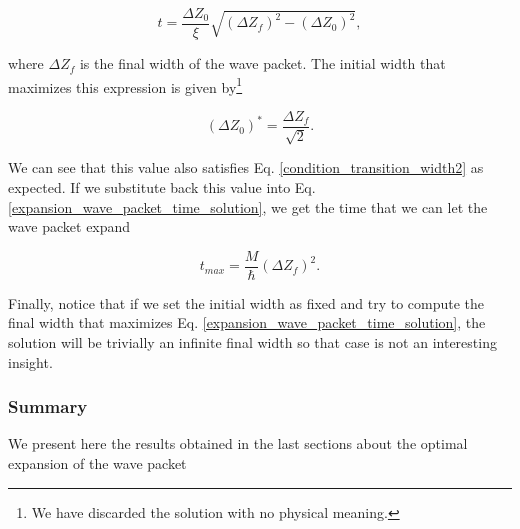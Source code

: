 \documentclass{article}
\begin{document}
\begin{equation}\label{expansion_wave_packet_time_solution}
    t = \frac{\Delta Z_{0}}{\xi} \sqrt{(\Delta Z_{f})^2 - (\Delta Z_{0})^2},
\end{equation}

where $\Delta Z_{f}$ is the final width of the wave packet. The initial width that maximizes this expression is given by\footnote{We have discarded the solution with no physical meaning.}

\begin{equation}\label{ratio_optimial_initial_width_vs_final_width_time_max}
    (\Delta Z_{0})^{\ast} = \frac{\Delta Z_{f}}{\sqrt{2}}.
\end{equation}

We can see that this value also satisfies Eq. \ref{condition_transition_width2} as expected. If we substitute back this value into Eq. \ref{expansion_wave_packet_time_solution}, we get the time that we can let the wave packet expand

\begin{equation}\label{t_maximized_given_initial_width}
    t_{max} = \frac{M}{\hbar} (\Delta Z_{f})^2.
\end{equation}

Finally, notice that if we set the initial width as fixed and try to compute the final width that maximizes Eq. \ref{expansion_wave_packet_time_solution}, the solution will be trivially an infinite final width so that case is not an interesting insight. 

\subsubsection{Summary}
We present here the results obtained in the last sections about the optimal expansion of the wave packet
\end{document}
